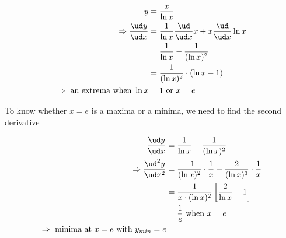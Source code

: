 \begin{solution}[\fullpage]
	\begin{align}
	   y &= \dfrac{x}{\ln x} \\
	   \Rightarrow \dfrac{\ud y}{\ud x} &= \dfrac{1}{\ln x}\dfrac{\ud}{\ud x}x 
	             + x\dfrac{\ud}{\ud x}\ln x \\
	     &= \dfrac{1}{\ln x} - \dfrac{1}{(\ln x)^2} \\
	     &= \dfrac{1}{(\ln x)^2}\cdot(\ln x - 1) \\
	     \Rightarrow \text{ an extrema when } \ln x &= 1 \text{ or } x = e
	\end{align}
	
	To know whether $x=e$ is a maxima or a minima, we need to find the second derivative
	
	\begin{align}
	   \dfrac{\ud y}{\ud x} &= \dfrac{1}{\ln x} - \dfrac{1}{(\ln x)^2} \\
	   \Rightarrow \dfrac{\ud^2 y}{\ud x^2} &= \dfrac{-1}{(\ln x)^2}\cdot\dfrac{1}{x}
	                                        + \dfrac{2}{(\ln x)^3}\cdot\dfrac{1}{x} \\
	               &= \dfrac{1}{x\cdot(\ln x)^2}\left[ \dfrac{2}{\ln x} - 1\right] \\
	               &= \dfrac{1}{e} \text{ when } x = e \\
	               \Rightarrow \text{ minima at } x = e \text{ with } y_{min} = e
	\end{align}
\end{solution}
